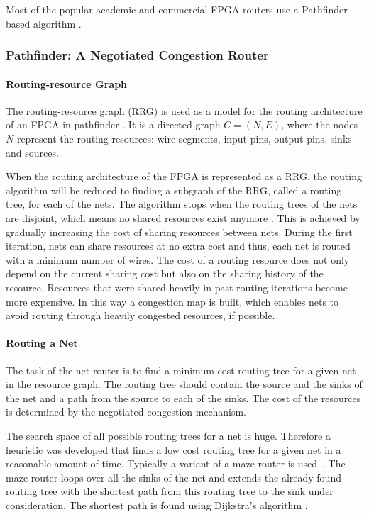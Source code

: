 \documentclass[a4paper,oneside,12pt]{article}
\begin{document}
Most of the popular academic and commercial FPGA routers use a Pathfinder based algorithm \cite{vprboek,betz1997vanppartffr}.

\subsubsection{{\sc Pathfinder}: A Negotiated Congestion Router}
\label{sec:pathfinder}
\paragraph{Routing-resource Graph}
The routing-resource graph (RRG) is used as a model for the routing architecture of an FPGA in {\sc pathfinder} \cite{mcmurchie1995panprff}. It is a directed graph $C=(N,E)$, where the nodes $N$ represent the routing resources: wire segments, input pins, output pins, sinks and sources.

When the routing architecture of the FPGA is represented as a RRG, the routing algorithm will be reduced to finding a subgraph of the RRG, called a routing tree, for each of the nets. The algorithm stops when the routing trees of the nets are disjoint, which means no shared resources exist anymore \cite{nair1987asyetfgw}.
This is achieved by gradually increasing the cost of sharing resources between nets. During the first iteration, nets can share resources at no extra cost and thus, each net is routed with a minimum number of wires. The cost of a routing resource does not only depend on the current sharing cost but also on the sharing history of the resource. Resources that were shared heavily in past routing iterations become more expensive. In this way a congestion map is built, which enables nets to avoid routing through heavily congested resources, if possible.

\paragraph{Routing a Net}
The task of the net router is to find a minimum cost routing tree for a given net in the resource graph. The routing tree should contain the source and the sinks of the net and a path from the source to each of the sinks. The cost of the resources is determined by the negotiated congestion mechanism.

The search space of all possible routing trees for a net is huge. Therefore a heuristic was developed that finds a low cost routing tree for a given net in a reasonable amount of time. Typically a variant of a maze router is used~\cite{lee1961aafpcaia}. The maze router loops over all the sinks of the net and extends the already found routing tree with the shortest path from this routing tree to the sink under consideration. The shortest path is found using Dijkstra's algorithm \cite{dijkstra1959anotpicwg}.
\end{document}
